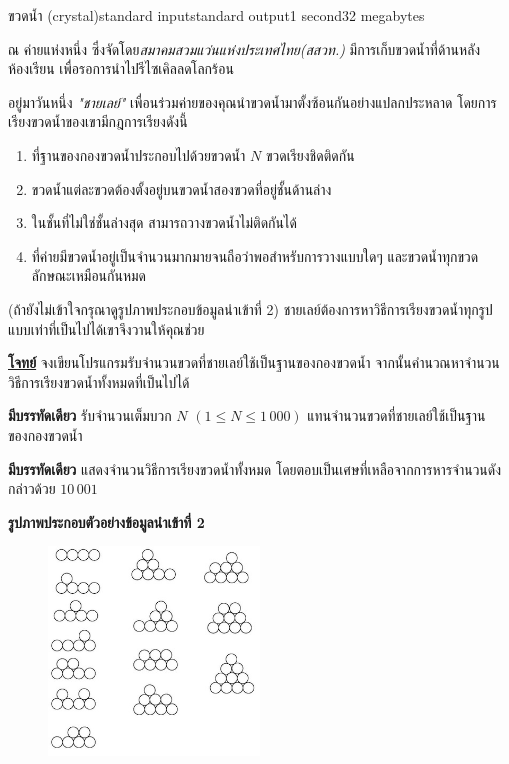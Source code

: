 \documentclass[11pt,a4paper]{article}
\begin{document}
\begin{problem}{ขวดน้ำ (crystal)}{standard input}{standard output}{1 second}{32 megabytes}

ณ ค่ายแห่งหนึ่ง ซึ่งจัดโดย\textit{สมาคมสวมแว่นแห่งประเทศไทย(สสวท.)} มีการเก็บขวดน้ำที่ด้านหลังห้องเรียน เพื่อรอการนำไปรีไซเคิลลดโลกร้อน

อยู่มาวันหนึ่ง \textit{"ชายเลย์"} เพื่อนร่วมค่ายของคุณนำขวดน้ำมาตั้งซ้อนกันอย่างแปลกประหลาด โดยการเรียงขวดน้ำของเขามีกฎการเรียงดังนี้

\begin{enumerate}

\item ที่ฐานของกองขวดน้ำประกอบไปด้วยขวดน้ำ $N$ ขวดเรียงชิดติดกัน
\item ขวดน้ำแต่ละขวดต้องตั้งอยู่บนขวดน้ำสองขวดที่อยู่ชั้นด้านล่าง
\item ในชั้นที่ไม่ใช่ชั้นล่างสุด สามารถวางขวดน้ำไม่ติดกันได้
\item ที่ค่ายมีขวดน้ำอยู่เป็นจำนวนมากมายจนถือว่าพอสำหรับการวางแบบใดๆ และขวดน้ำทุกขวดลักษณะเหมือนกันหมด
\end{enumerate}

(ถ้ายังไม่เข้าใจกรุณาดูรูปภาพประกอบข้อมูลนำเข้าที่ 2)
ชายเลย์ต้องการหาวิธีการเรียงขวดน้ำทุกรูปแบบเท่าที่เป็นไปได้เขาจึงวานให้คุณช่วย


\bigskip
\underline{\textbf{โจทย์}}  จงเขียนโปรแกรมรับจำนวนขวดที่ชายเลย์ใช้เป็นฐานของกองขวดน้ำ จากนั้นคำนวณหาจำนวนวิธีการเรียงขวดน้ำทั้งหมดที่เป็นไปได้


\InputFile

\textbf{มีบรรทัดเดียว} รับจำนวนเต็มบวก $N$ $(1 \leq N \leq 1\,000)$ แทนจำนวนขวดที่ชายเลย์ใช้เป็นฐานของกองขวดน้ำ

\OutputFile

\textbf{มีบรรทัดเดียว} แสดงจำนวนวิธีการเรียงขวดน้ำทั้งหมด โดยตอบเป็นเศษที่เหลือจากการหารจำนวนดังกล่าวด้วย $10\,001$

\Examples

\begin{example}
%
%
%
\end{example}

\Note 

\textbf{รูปภาพประกอบตัวอย่างข้อมูลนำเข้าที่ 2} 

\begin{figure}[!h]
\centering
\includegraphics[width=0.5\textwidth]{../latex/img/1172/1172-1.jpeg}
\end{figure}


\end{problem}
\end{document}
